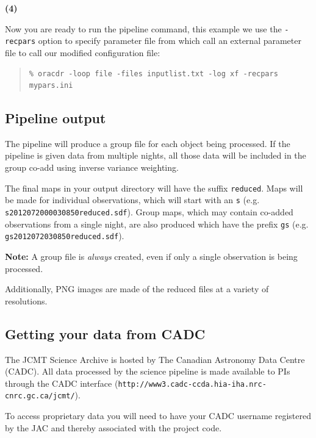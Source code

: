 \documentclass[twoside,11pt]{article}
\newcommand{\xlabel}[1]{}
\renewcommand{\_}{\texttt{\symbol{95}}}
\newenvironment{myquote}{\begin{quote}\begin{small}}{\end{small}\end{quote}}
\begin{document}
\begin{minipage}[t]{0.05\linewidth}
\textbf{(4)}
\end{minipage}
\begin{minipage}[t]{0.95\linewidth}
Now you are ready to run the pipeline command, this example we use the
\texttt{-recpars} option to specify parameter file from which call an
external parameter file to call our modified configuration file:
\begin{myquote}
\begin{verbatim}
% oracdr -loop file -files inputlist.txt -log xf -recpars mypars.ini
\end{verbatim}
\end{myquote}
\end{minipage}

\subsection{\xlabel{pl_output}Pipeline output}

The pipeline will produce a group file for each object being
processed. If the pipeline is given data from multiple nights, all
those data will be included in the group co-add using inverse variance
weighting.

The final maps in your output directory will have the suffix
\texttt{\_reduced}. Maps will be made for individual observations,
which will start with an \texttt{s} (e.g.
\texttt{s20120720\_00030\_850\_reduced.sdf}). Group maps, which may contain
co-added observations from a single night, are also produced which
have the prefix \texttt{gs} (e.g. \texttt{gs20120720\_30\_850\_reduced.sdf}).

\textbf{Note:} A group file is \emph{always} created, even if only a single
observation is being processed.

Additionally, PNG images are made of the reduced files at a variety of
resolutions.

\subsection{\xlabel{cadc}Getting your data from CADC}

The JCMT Science Archive is hosted by The Canadian Astronomy Data
Centre (CADC). All data processed by the science pipeline is made
available to PIs through the CADC interface
(\texttt{http://www3.cadc-ccda.hia-iha.nrc-cnrc.gc.ca/jcmt/}).

To access proprietary data you will need to have your CADC username
registered by the JAC and thereby associated with the project code.
\end{document}
